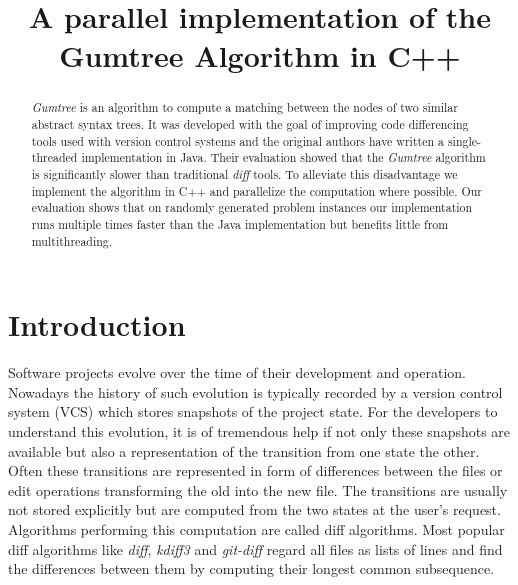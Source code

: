 \documentclass[letterpaper]{article}
\title{A parallel implementation of the Gumtree Algorithm in C++}
\begin{document}
%
\maketitle
%

\begin{abstract}

\emph{Gumtree} is an algorithm to compute a matching between the nodes of two similar abstract syntax trees.
It was developed with the goal of improving code differencing tools used with version control systems and the original authors have written a single-threaded implementation in Java.
Their evaluation showed that the \emph{Gumtree} algorithm is significantly slower than traditional \emph{diff} tools.
To alleviate this disadvantage we implement the algorithm in C++ and parallelize the computation where possible.
Our evaluation shows that on randomly generated problem instances our implementation runs multiple times faster than the Java implementation but benefits little from multithreading.
\end{abstract}

\section{Introduction}\label{sec:intro}


Software projects evolve over the time of their development and operation.
Nowadays the history of such evolution is typically recorded by a version control system (VCS) which stores snapshots of the project state.
For the developers to understand this evolution, it is of tremendous help if not only these snapshots are available but also a representation of the transition from one state the other.
Often these transitions are represented in form of differences between the files or edit operations transforming the old into the new file.
The transitions are usually not stored explicitly but are computed from the two states at the user's request.
Algorithms performing this computation are called diff algorithms.
Most popular diff algorithms like \emph{diff}, \emph{kdiff3} and \emph{git-diff} regard all files as lists of lines and find the differences between them by computing their longest common subsequence.
\end{document}
